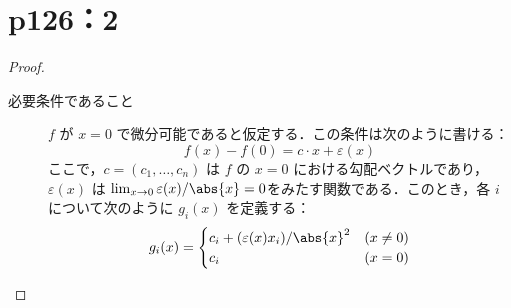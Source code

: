 \documentclass[a4paper,10pt,fleqn]{ltjsarticle}
\begin{document}
\section*{p126：2}


\begin{tleftbar}
    \begin{proof}
        \begin{description}
            \item[必要条件であること]
                  $ f $ が $ x=0 $ で微分可能であると仮定する．この条件は次のように書ける：
                  \[
                      f(x) - f(0) = c \cdot x + \varepsilon(x)
                  \]
                  ここで，$ c = (c_1, \ldots, c_n) $ は $ f $ の $ x=0 $ における勾配ベクトルであり，$ \varepsilon(x) $ は
                  $\lim_{x \to 0} \varepsilon(x)/\abs{x} = 0$をみたす関数である．このとき，各 $ i $ について次のように $ g_i(x) $ を定義する：
                  \[
                      g_i(x) =
                      \begin{cases}
                          c_i + (\varepsilon(x) x_i)/\abs{x}^2 & (x \ne 0) \\
                          c_i                                  & (x = 0)
                      \end{cases}
                  \]


\end{description}
\end{proof}
\end{tleftbar}
\end{document}
